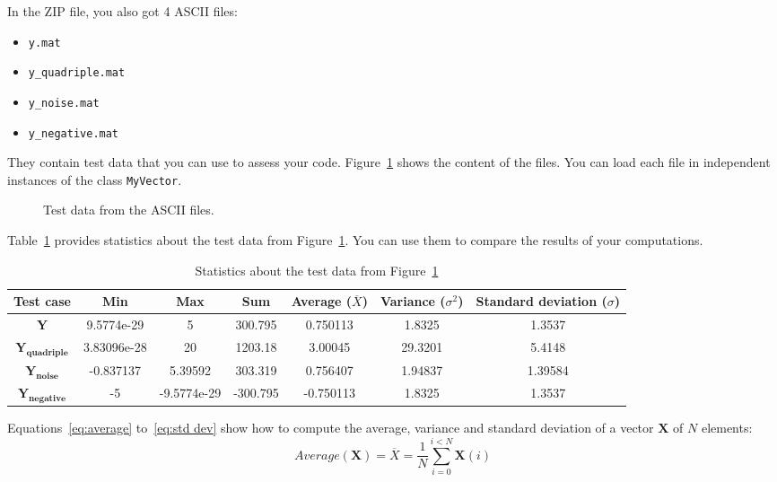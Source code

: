 \documentclass[english,a4paper,12pt,oneside]{article}
\begin{document}
In the ZIP file, you also got 4 ASCII files:
\begin{itemize}
 \item \verb+y.mat+
 \item \verb+y_quadriple.mat+
 \item \verb+y_noise.mat+
 \item \verb+y_negative.mat+
\end{itemize}
They contain test data that you can use to assess your code. 
Figure~\ref{fig:test data} shows the content of the files. 
You can load each file in independent instances of the class \verb+MyVector+. 
\begin{figure}[htb]
\centering
\scalebox{0.75}{}
 \caption{\label{fig:test data}Test data from the ASCII files.}
\end{figure}
Table~\ref{tab:test data} provides statistics about the test data from Figure~\ref{fig:test data}. 
You can use them to compare the results of your computations. 
\begin{table}[htb]
\caption{\label{tab:test data}Statistics about the test data from Figure~\ref{fig:test data}}
\centering
\begin{footnotesize}
 \begin{tabular}{|c|c|c|c|c|c|c|}
  \hline
  \textbf{Test case} & \textbf{Min} & \textbf{Max} & \textbf{Sum} & \textbf{Average} ($\overline{X}$)& \textbf{Variance} ($\sigma^2$) & \textbf{Standard deviation} ($\sigma$)\\
  \hline
  \hline
  $\mathbf{Y}$ & 9.5774e-29 & 5 & 300.795 & 0.750113 & 1.8325 & 1.3537 \\
  \hline
  $\mathbf{Y_{quadriple}}$ & 3.83096e-28 & 20 & 1203.18 & 3.00045 & 29.3201 & 5.4148 \\
  \hline
  $\mathbf{Y_{noise}}$ & -0.837137 & 5.39592 & 303.319 & 0.756407 & 1.94837 & 1.39584 \\
  \hline
  $\mathbf{Y_{negative}}$ & -5 & -9.5774e-29 & -300.795 & -0.750113 & 1.8325 & 1.3537 \\
  \hline
 \end{tabular}
\end{footnotesize}
\end{table}

Equations~\ref{eq:average} to~\ref{eq:std dev} show how to compute the average, variance and standard deviation of a vector $\mathbf{X}$ of $N$ elements:
\begin{equation}
 Average(\mathbf{X}) = \overline{X} = \frac{1}{N}\sum_{i=0}^{i < N} \mathbf{X}(i)
 \label{eq:average}
\end{equation}
\end{document}
